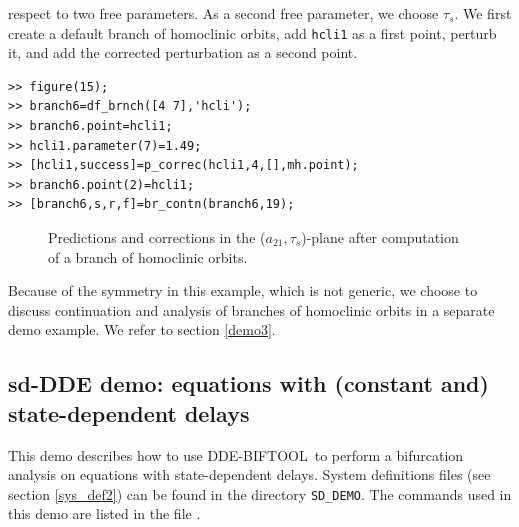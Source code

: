 \documentclass[10pt]{article}
\gdef \DDEBIFCODE{{\scshape DDE-BIFTOOL}}
\gdef \file#1{{\bfseries{\ttfamily{#1}}}}
\begin{document}
{respect to two free parameters.  As a second free parameter, 
we choose $\tau_s$. We first create a default branch of homoclinic orbits,
add \verb#hcli1# as a first point, perturb it, and add the corrected
perturbation as a second point.
{\small\begin{verbatim}
>> figure(15);
>> branch6=df_brnch([4 7],'hcli');
>> branch6.point=hcli1;
>> hcli1.parameter(7)=1.49;
>> [hcli1,success]=p_correc(hcli1,4,[],mh.point);
>> branch6.point(2)=hcli1;
>> [branch6,s,r,f]=br_contn(branch6,19);
\end{verbatim}} 
\begin{figure}[h]
\begin{center}
\end{center}
\caption{\small\label{ride15_pic}Predictions and corrections in the 
($a_{21},\tau_s$)-plane after computation of a branch of homoclinic 
orbits.}
\end{figure}
Because of the symmetry in this example, which is not generic, we choose to 
discuss continuation and analysis of branches of homoclinic orbits in a 
separate demo example.  We refer to section \ref{demo3}.

\subsection{sd-DDE demo: equations with (constant and) 
state-dependent delays}\label{demo2} 
This demo describes how to use \DDEBIFCODE\ to perform a 
bifurcation analysis on equations
with state-dependent delays.  System definitions files 
(see section \ref{sys_def2}) can be
found in the directory \verb$SD_DEMO$.  The commands used in this 
demo are listed in the file 
\file{sd\_demo.m}.

}
\end{document}
